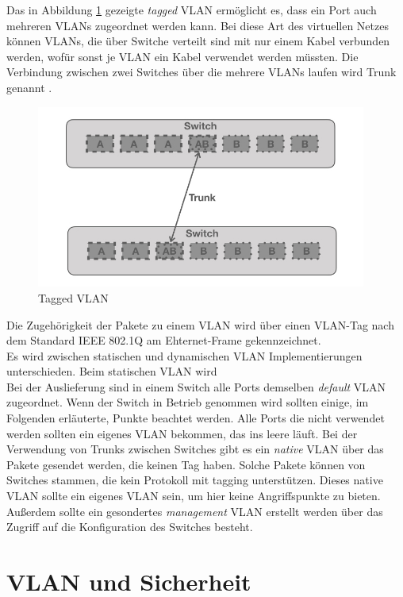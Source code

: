 Das in Abbildung \ref{vlanpak} gezeigte \emph{tagged} VLAN ermöglicht es, dass ein Port auch mehreren VLANs zugeordnet werden kann. Bei  diese Art des virtuellen Netzes können VLANs, die über  Switche verteilt sind mit nur einem Kabel verbunden werden, wofür sonst je VLAN ein Kabel verwendet werden müssten. Die Verbindung zwischen zwei Switches über die mehrere VLANs laufen wird Trunk genannt \cite{cisco14rout}. 

\begin{figure}[h]
\centering
	\includegraphics[width=0.8\linewidth,height=6cm]{vlan.002.jpeg}
	\caption{Tagged VLAN}
	\label{vlanpak}
\end{figure} 

Die Zugehörigkeit der Pakete zu einem VLAN wird über einen VLAN-Tag nach dem Standard  IEEE 802.1Q am Ehternet-Frame gekennzeichnet.\\

Es wird zwischen statischen und dynamischen VLAN Implementierungen unterschieden. Beim statischen VLAN wird 
\\

Bei der Auslieferung sind in einem Switch alle Ports demselben \emph{default} VLAN zugeordnet. Wenn der Switch in Betrieb genommen wird sollten einige, im Folgenden erläuterte,  Punkte beachtet werden. Alle Ports die nicht verwendet werden sollten ein eigenes VLAN bekommen, das ins leere läuft. Bei der Verwendung von Trunks zwischen Switches gibt es ein \emph{native} VLAN über das Pakete gesendet werden, die keinen Tag haben. Solche Pakete können von Switches stammen, die kein Protokoll mit tagging unterstützen. Dieses native VLAN sollte ein eigenes VLAN sein, um hier keine Angriffspunkte zu bieten. Außerdem sollte ein gesondertes \emph{management} VLAN erstellt werden über das Zugriff auf die Konfiguration des  Switches besteht. 




\section{VLAN und Sicherheit}

